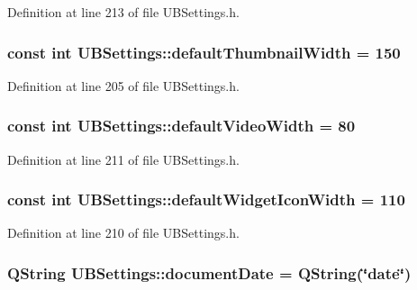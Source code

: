 Definition at line 213 of file U\-B\-Settings.\-h.

\hypertarget{class_u_b_settings_ab24f23ee045a939cacac49c1d9669220}{
\subsubsection[{default\-Thumbnail\-Width}]{\setlength{\rightskip}{0pt plus 5cm}const int U\-B\-Settings\-::default\-Thumbnail\-Width = 150\hspace{0.3cm}{\ttfamily [static]}}}\label{db/d66/class_u_b_settings_ab24f23ee045a939cacac49c1d9669220}


Definition at line 205 of file U\-B\-Settings.\-h.

\hypertarget{class_u_b_settings_a29a27d9d1f0039e45cee7e0699cb9bdd}{
\subsubsection[{default\-Video\-Width}]{\setlength{\rightskip}{0pt plus 5cm}const int U\-B\-Settings\-::default\-Video\-Width = 80\hspace{0.3cm}{\ttfamily [static]}}}\label{db/d66/class_u_b_settings_a29a27d9d1f0039e45cee7e0699cb9bdd}


Definition at line 211 of file U\-B\-Settings.\-h.

\hypertarget{class_u_b_settings_a4dd74f823ed8465998d8d4f701e6fdfd}{
\subsubsection[{default\-Widget\-Icon\-Width}]{\setlength{\rightskip}{0pt plus 5cm}const int U\-B\-Settings\-::default\-Widget\-Icon\-Width = 110\hspace{0.3cm}{\ttfamily [static]}}}\label{db/d66/class_u_b_settings_a4dd74f823ed8465998d8d4f701e6fdfd}


Definition at line 210 of file U\-B\-Settings.\-h.

\hypertarget{class_u_b_settings_ac6c81f3415f2a306cd298f729cba4b1d}{
\subsubsection[{document\-Date}]{\setlength{\rightskip}{0pt plus 5cm}Q\-String U\-B\-Settings\-::document\-Date = Q\-String(\char`\"{}date\char`\"{})\hspace{0.3cm}{\ttfamily [static]}}}\label{db/d66/class_u_b_settings_ac6c81f3415f2a306cd298f729cba4b1d}


